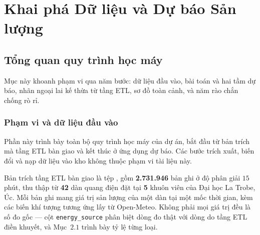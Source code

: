 \chapter{Khai phá Dữ liệu và Dự báo Sản lượng}
\label{chap:forecasting}

%

\FloatBarrier
\section{Tổng quan quy trình học máy}

Mục này khoanh phạm vi qua năm bước: dữ liệu đầu vào, bài toán và hai tầm dự báo, nhãn
ngoại lai kế thừa từ tầng ETL, sơ đồ toàn cảnh, và năm rào chắn chống rò rỉ.

\FloatBarrier
\subsection{Phạm vi và dữ liệu đầu vào}

Phần này trình bày toàn bộ quy trình học máy của dự án, bắt đầu từ bản trích mà tầng ETL
bàn giao và kết thúc ở ứng dụng dự báo. Các bước trích xuất, biến đổi và
nạp dữ liệu vào kho không thuộc phạm vi tài liệu này.

Bản trích tầng ETL bàn giao là tệp ,
gồm \textbf{2.731.946} bản ghi ở độ phân giải $15$ phút, thu thập từ \textbf{42} dàn
quang điện đặt tại \textbf{5} khuôn viên của Đại học La Trobe, Úc. Mỗi bản ghi mang
giá trị sản lượng của một dàn tại một mốc thời gian, kèm các biến khí tượng tương ứng lấy từ
Open-Meteo. Không phải mọi giá trị đều là số đo gốc --- cột \texttt{energy\_source} phân biệt dòng
đo thật với dòng do tầng ETL điền khuyết, và Mục~$2.1$ trình bày tỷ lệ từng loại.

